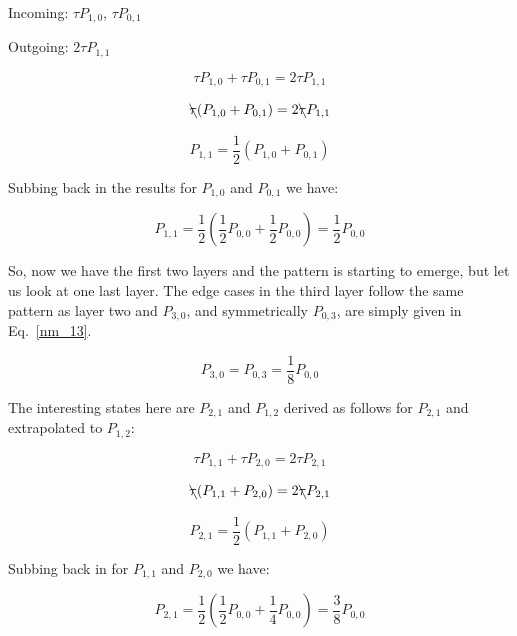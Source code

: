 \documentclass[conference]{IEEEtran}
\begin{document}
Incoming: $\tau P_{1,0}$, $\tau P_{0,1}$

Outgoing: $2\tau P_{1,1}$

\begin{equation}
  \tau P_{1,0} + \tau P_{0,1} = 2\tau P_{1,1} \label{nm_9}
\end{equation}

\begin{equation}
  \bcancel{\tau} (P_{1,0} + P_{0,1}) = 2\bcancel{\tau} P_{1,1} \label{nm_10}
\end{equation}

\begin{equation}
  P_{1,1} = \frac{1}{2}(P_{1,0} + P_{0,1})\label{nm_11}
\end{equation}

Subbing back in the results for $P_{1,0}$ and $P_{0,1}$ we have:

\begin{equation}
  P_{1,1} = \frac{1}{2}(\frac{1}{2}P_{0,0} + \frac{1}{2}P_{0,0})=\frac{1}{2}P_{0,0}\label{nm_12}
\end{equation}

So, now we have the first two layers and the pattern is starting to emerge, but
let us look at one last layer. The edge cases in the third layer follow the same pattern
as layer two and $P_{3,0}$, and symmetrically $P_{0,3}$, are simply given in Eq.~\ref{nm_13}.

\begin{equation}
  P_{3,0} = P_{0,3} = \frac{1}{8}P_{0,0}\label{nm_13}
\end{equation}

The interesting states here are $P_{2,1}$ and $P_{1, 2}$ derived as follows 
for $P_{2,1}$ and extrapolated to $P_{1,2}$:

\begin{equation}
  \tau P_{1,1} + \tau P_{2,0} = 2\tau P_{2,1} \label{nm_14}
\end{equation}

\begin{equation}
  \bcancel{\tau} (P_{1,1} + P_{2,0}) = 2\bcancel{\tau} P_{2,1} \label{nm_15}
\end{equation}

\begin{equation}
  P_{2,1} = \frac{1}{2}(P_{1,1} + P_{2,0})\label{nm_16}
\end{equation}

Subbing back in for $P_{1,1}$ and $P_{2,0}$ we have:

\begin{equation}
  P_{2,1} = \frac{1}{2}(\frac{1}{2}P_{0,0} + \frac{1}{4}P_{0,0}) = \frac{3}{8}P_{0,0}\label{nm_17}
\end{equation}
\end{document}
